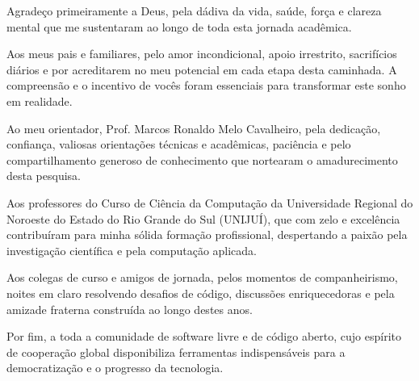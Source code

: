 \documentclass[
    12pt,               %
    oneside,            %
    a4paper,            %
    chapter=TITLE,      %
    section=TITLE,      %
    english,            %
    brazil,             %
    article             %
]{abntex2}
\begin{document}

\frenchspacing


\pretextual

\imprimircapa

\imprimirfolhaderosto

%     

\imprimirfolhadabanca

\begin{agradecimentos}
    Agradeço primeiramente a Deus, pela dádiva da vida, saúde, força e clareza mental que me sustentaram ao longo de toda esta jornada acadêmica.

    Aos meus pais e familiares, pelo amor incondicional, apoio irrestrito, sacrifícios diários e por acreditarem no meu potencial em cada etapa desta caminhada. A compreensão e o incentivo de vocês foram essenciais para transformar este sonho em realidade.

    Ao meu orientador, Prof. Marcos Ronaldo Melo Cavalheiro, pela dedicação, confiança, valiosas orientações técnicas e acadêmicas, paciência e pelo compartilhamento generoso de conhecimento que nortearam o amadurecimento desta pesquisa.

    Aos professores do Curso de Ciência da Computação da Universidade Regional do Noroeste do Estado do Rio Grande do Sul (UNIJUÍ), que com zelo e excelência contribuíram para minha sólida formação profissional, despertando a paixão pela investigação científica e pela computação aplicada.

    Aos colegas de curso e amigos de jornada, pelos momentos de companheirismo, noites em claro resolvendo desafios de código, discussões enriquecedoras e pela amizade fraterna construída ao longo destes anos.

    Por fim, a toda a comunidade de software livre e de código aberto, cujo espírito de cooperação global disponibiliza ferramentas indispensáveis para a democratização e o progresso da tecnologia.
\end{agradecimentos}
\clearpage
\end{document}
